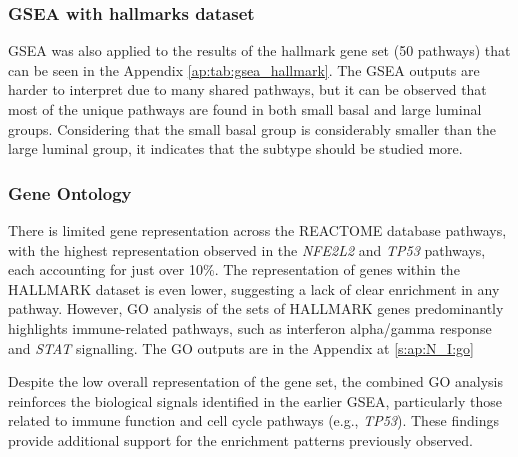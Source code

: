 \subsubsection*{GSEA with hallmarks dataset}


GSEA was also applied to the results of the hallmark gene set (50 pathways) that can be seen in the Appendix \cref{ap:tab:gsea_hallmark}. The GSEA outputs are harder to interpret due to many shared pathways, but it can be observed that most of the unique pathways are found in both small basal and large luminal groups. Considering that the small basal group is considerably smaller than the large luminal group, it indicates that the subtype should be studied more.

\subsubsection*{Gene Ontology} \label{s:N_I:sel_tfs_go}

There is limited gene representation across the REACTOME database pathways, with the highest representation observed in the \textit{NFE2L2} and \textit{TP53} pathways, each accounting for just over 10\%. The representation of genes within the HALLMARK dataset is even lower, suggesting a lack of clear enrichment in any pathway. However, GO analysis of the sets of HALLMARK genes predominantly highlights immune-related pathways, such as interferon alpha/gamma response and \textit{STAT} signalling. The GO outputs are in the Appendix at \cref{s:ap:N_I:go}

Despite the low overall representation of the gene set, the combined GO analysis reinforces the biological signals identified in the earlier GSEA, particularly those related to immune function and cell cycle pathways (e.g., \textit{TP53}). These findings provide additional support for the enrichment patterns previously observed.


